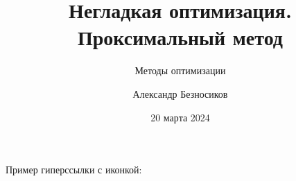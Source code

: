 \documentclass[aspectratio=43,11pt,xcolor=dvipsnames]{beamer}
\title[Лекция 5]{Негладкая оптимизация. Проксимальный метод}
\subtitle{Методы оптимизации}
\author[Александр Безносиков]{Александр Безносиков}
\date{20 марта 2024}
\begin{document}
\begin{frame}
	\titlepage
\end{frame}
\begin{frame}
    Пример гиперссылки с иконкой:
\end{frame}
\end{document}
